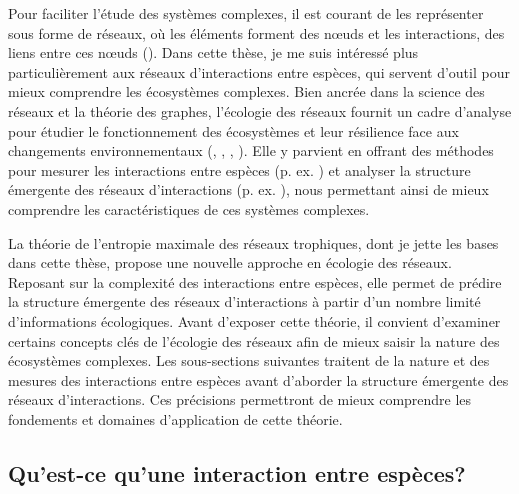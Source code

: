 Pour faciliter l'étude des systèmes complexes, il est courant de les représenter
sous forme de réseaux, où les éléments forment des nœuds et les interactions,
des liens entre ces nœuds (\cite{Newman2003Structure}). Dans cette thèse, je me
suis intéressé plus particulièrement aux réseaux d'interactions entre espèces,
qui servent d'outil pour mieux comprendre les écosystèmes complexes. Bien ancrée
dans la science des réseaux et la théorie des graphes, l'écologie des réseaux
fournit un cadre d'analyse pour étudier le fonctionnement des écosystèmes et
leur résilience face aux changements environnementaux
(\cite{McCann2007Protecting}, \cite{McCann2011Food}, \cite{Proulx2005Network},
\cite{Rooney2012Integrating}). Elle y parvient en offrant des méthodes pour
mesurer les interactions entre espèces (p. ex. \cite{Jordano2016Sampling}) et
analyser la structure émergente des réseaux d'interactions (p. ex.
\cite{Delmas2019Analysing}), nous permettant ainsi de mieux comprendre les
caractéristiques de ces systèmes complexes. 

La théorie de l'entropie maximale des réseaux trophiques, dont je jette les
bases dans cette thèse, propose une nouvelle approche en écologie des réseaux.
Reposant sur la complexité des interactions entre espèces, elle permet de
prédire la structure émergente des réseaux d'interactions à partir d'un nombre
limité d'informations écologiques. Avant d'exposer cette théorie, il convient
d'examiner certains concepts clés de l'écologie des réseaux afin de mieux saisir
la nature des écosystèmes complexes. Les sous-sections suivantes traitent de la
nature et des mesures des interactions entre espèces avant d'aborder la
structure émergente des réseaux d'interactions. Ces précisions permettront de
mieux comprendre les fondements et domaines d'application de cette théorie.  

\subsection{Qu'est-ce qu'une interaction entre espèces?} 

